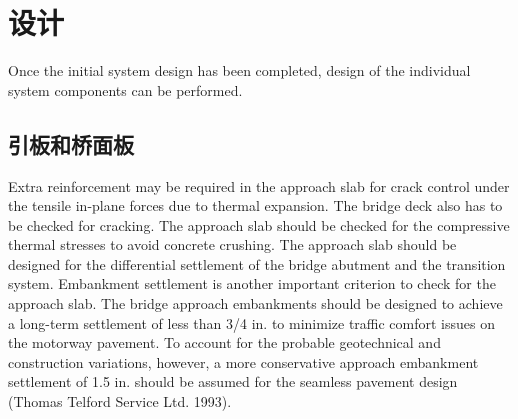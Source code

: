 \section{设计}
Once the initial system design has been completed, design of the individual system components can be performed.

\subsection{引板和桥面板}
Extra reinforcement may be required in the approach slab for crack control under the tensile in-plane forces due to thermal expansion. The bridge deck also has to be checked for cracking. The approach slab should be checked for the compressive thermal stresses to avoid concrete crushing. The approach slab should be designed for the differential settlement of the bridge abutment and the transition system. Embankment settlement is another important criterion to check for the approach slab. The bridge approach embankments should be designed to achieve a long-term settlement of less than 3/4 in. to minimize traffic comfort issues on the motorway pavement. To account for the probable geotechnical and construction variations, however, a more conservative approach embankment settlement of 1.5 in. should be assumed for the seamless pavement design (Thomas Telford Service Ltd. 1993).

